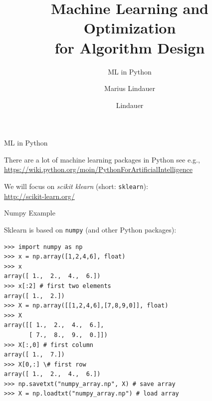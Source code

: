 \documentclass[t,handout]{beamer}
\title[MLOAD]{Machine Learning and Optimization\\ for Algorithm Design}
\subtitle{ML in Python}
\author{Marius Lindauer}
\institute{University of Freiburg}
\date{}
\begin{document}
{
}
\author{Lindauer}
\institute{}
\logo{}

\begin{frame}[c]{ML in Python}

There are a lot of machine learning packages in Python see e.g.,\\ 
{\small
\url{https://wiki.python.org/moin/PythonForArtificialIntelligence}}

\bigskip

We will focus on \emph{scikit klearn} (short: \texttt{sklearn}):\\
\url{http://scikit-learn.org/}

\end{frame}
\begin{frame}[c, fragile]{Numpy Example}

Sklearn is based on \texttt{numpy} (and other Python packages):

\small
\begin{verbatim}
>>> import numpy as np
>>> x = np.array([1,2,4,6], float)
>>> x
array([ 1.,  2.,  4.,  6.])
>>> x[:2] # first two elements
array([ 1.,  2.])
>>> X = np.array([[1,2,4,6],[7,8,9,0]], float)
>>> X
array([[ 1.,  2.,  4.,  6.],
       [ 7.,  8.,  9.,  0.]])
>>> X[:,0] # first column
array([ 1.,  7.])
>>> X[0,:] \# first row
array([ 1.,  2.,  4.,  6.])
>>> np.savetxt("numpy_array.np", X) # save array
>>> X = np.loadtxt("numpy_array.np") # load array
\end{verbatim}

\end{frame}
\end{document}
